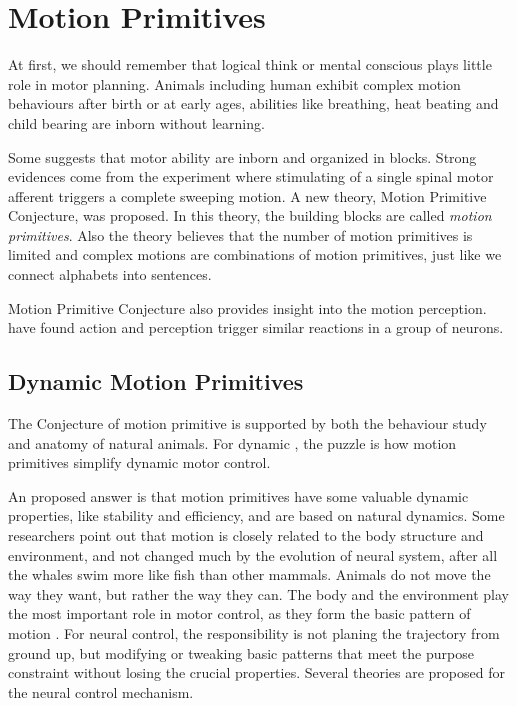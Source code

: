 \section{Motion Primitives}
At first, we should remember that logical think or mental conscious plays little role in motor planning.
Animals including human exhibit complex motion behaviours after birth or at early ages, abilities like breathing, heat beating and child bearing are inborn without learning.

Some suggests that motor ability are inborn and organized in blocks\citep{bizzi1995modular,bizzi2002book}.
Strong evidences come from the experiment where stimulating of a single spinal motor afferent triggers a complete sweeping motion\citep{bizzi1995modular}.
A new theory, Motion Primitive Conjecture, was proposed.
In this theory, the building blocks are called \emph{motion primitives}.
Also the theory believes that the number of motion primitives is limited and
complex motions are combinations of motion primitives, just like we connect alphabets into sentences.

Motion Primitive Conjecture also provides insight into the motion perception.
\citet{gallese1996action} have found action and perception trigger similar reactions in a group of neurons.





\subsection{Dynamic Motion Primitives}
The Conjecture of motion primitive is supported by both the behaviour study and anatomy of natural animals.
For dynamic \cms, the puzzle is how motion primitives simplify dynamic motor control.

An proposed answer is that motion primitives have some valuable dynamic properties, like stability and efficiency, and are based on natural dynamics.
Some researchers point out that motion is closely related to the body structure and environment,
and not changed much by the evolution of neural system, after all the whales swim more like fish than other mammals.
Animals do not move the way they want, but rather the way they can. 
The body and the environment play the most important role in motor control, as they form the basic pattern of motion \citep{nishikawa2007neuromechanics}.
For neural control, the responsibility is not planing the trajectory from ground up, but modifying or tweaking basic patterns that meet the purpose constraint without losing the crucial properties.
Several theories are proposed for the neural control mechanism.

